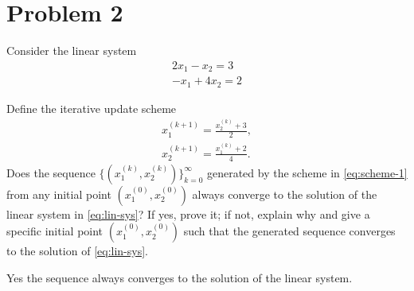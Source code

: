 \documentclass[12pt]{article}
\begin{document}
\newpage

\section*{Problem 2}
Consider the linear system
\begin{equation}\label{eq:lin-sys}
\begin{aligned}
2x_1 - x_2 = 3\\
-x_1 + 4x_2 = 2
\end{aligned}
\end{equation}

Define the iterative update scheme
\begin{equation}\label{eq:scheme-1}
\begin{aligned}
x_1^{(k+1)} = \frac{x_2^{(k)} +3}{2},\\
x_2^{(k+1)} = \frac{x_1^{(k)} + 2}{4}.
\end{aligned}
\end{equation}
Does the sequence $\{(x_1^{(k)},x_2^{(k)})\}_{k=0}^\infty$ generated by the scheme in \eqref{eq:scheme-1} from any initial point $(x_1^{(0)},x_2^{(0)})$ always converge to the solution of the linear system in \eqref{eq:lin-sys}? If yes, prove it; if not, explain why and give a specific initial point $(x_1^{(0)},x_2^{(0)})$ such that the generated sequence converges to the solution of \eqref{eq:lin-sys}.
\vspace{8mm}

\noindent Yes the sequence always converges to the solution of the linear system.

\vspace{4mm}
\end{document}
